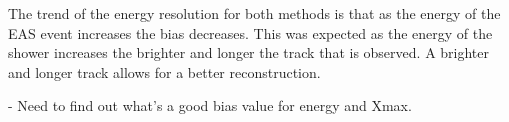 The trend of the energy resolution for both methods is that as the energy of the EAS event increases the bias decreases. This was expected as the energy of the shower increases the brighter and longer the track that is observed. A brighter and longer track allows for a better reconstruction.

- Need to find out what's a good bias value for energy and Xmax.

%


